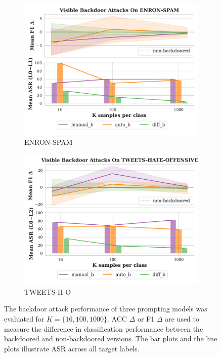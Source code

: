 \begin{figure}[!ht]
\begin{subfigure}{.33\textwidth}
  \includegraphics[width=\linewidth]{figures/evaluation_media/ENRON-SPAM_score_n_attack.pdf}
  \caption{ENRON-SPAM}
  \label{fig:enron}
\end{subfigure}
\begin{subfigure}{.33\textwidth}
  \centering
  \includegraphics[width=\linewidth]{figures/evaluation_media/TWEETS-HATE-OFFENSIVE_score_n_attack.pdf}
  \caption{TWEETS-H-O}
  \label{fig:tweets}
\end{subfigure}
\caption{The backdoor attack performance of three prompting models was evaluated for $K = \{16,100,1000\}$. ACC $\Delta$ or F1 $\Delta$ are used to measure the difference in classification performance between the backdoored and non-backdoored versions. The bar plots and the line plots illustrate $\overline{\text{ASR}}$ across all target labels.}
\label{fig:score_n_attack}
\end{figure}

